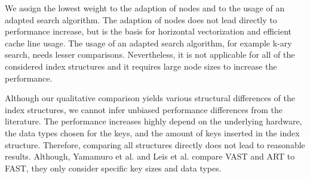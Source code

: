 \documentclass[conference]{IEEEtran}
\begin{document}
We assign the lowest weight to the adaption of nodes and to the usage of an adapted search algorithm. The adaption of nodes does not lead directly to performance increase, but is the basis for horizontal vectorization and efficient cache line usage. The usage of an adapted search algorithm, for example k-ary search, needs lesser comparisons. Nevertheless, it is not applicable for all of the considered index structures and it requires large node sizes to increase the performance.  

Although our qualitative comparison yields various structural differences of the index structures, we cannot infer unbiased performance differences from the literature. The performance increases highly depend on the underlying hardware, the data types chosen for the keys, and the amount of keys inserted in the index structure. Therefore, comparing all structures directly does not lead to reasonable results. Although, Yamamuro et al. and Leis et al. compare VAST \cite{b5} and ART \cite{b4} to FAST, they only consider specific key sizes and data types. 



\end{document}
